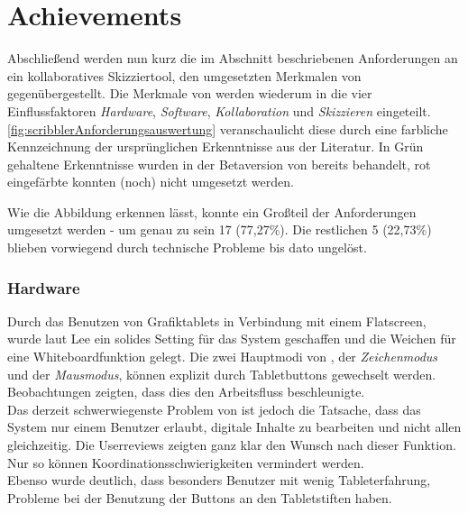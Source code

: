 \section{Achievements} 
Abschließend werden nun kurz die im Abschnitt  beschriebenen Anforderungen an ein kollaboratives Skizziertool, den umgesetzten Merkmalen von \scribbler gegenübergestellt. Die Merkmale von \scribbler werden wiederum in die vier Einflussfaktoren \emph{Hardware}, \emph{Software}, \emph{Kollaboration} und \emph{Skizzieren} eingeteilt.  \autoref{fig:scribblerAnforderungsauswertung} veranschaulicht diese durch eine farbliche Kennzeichnung der ursprünglichen Erkenntnisse aus der Literatur. In Grün gehaltene Erkenntnisse wurden in der Betaversion von \scribbler bereits behandelt, rot eingefärbte konnten (noch) nicht umgesetzt werden.

\medskip Wie die Abbildung erkennen lässt, konnte ein Großteil der Anforderungen umgesetzt werden - um genau zu sein 17 (77,27\%). Die restlichen 5 (22,73\%) blieben vorwiegend durch technische Probleme bis dato ungelöst.

\subsubsection*{Hardware} 
Durch das Benutzen von Grafiktablets in Verbindung mit einem Flatscreen, wurde laut Lee ein solides Setting für das System geschaffen und die Weichen für eine Whiteboardfunktion gelegt. Die zwei Hauptmodi von \scribbler, der \emph{Zeichenmodus} und der \emph{Mausmodus}, können explizit durch Tabletbuttons gewechselt werden. Beobachtungen zeigten, dass dies den Arbeitsfluss beschleunigte.\\
Das derzeit schwerwiegenste Problem von \scribbler ist jedoch die Tatsache, dass das System nur einem Benutzer erlaubt, digitale Inhalte zu bearbeiten und nicht allen gleichzeitig. Die Userreviews zeigten ganz klar den Wunsch nach dieser Funktion. Nur so können Koordinationsschwierigkeiten vermindert werden. \\
Ebenso wurde deutlich, dass besonders Benutzer mit wenig Tableterfahrung, Probleme bei der Benutzung der Buttons an den Tabletstiften haben.

